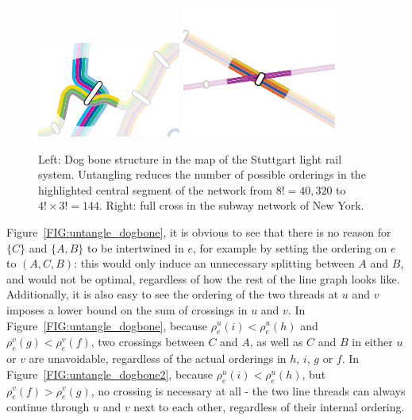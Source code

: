 \documentclass[format=acmsmall, review=false, screen=true]{acmart}
\begin{document}
\begin{figure}
  \centering
  \includegraphics[width=0.42\textwidth, page=1]{untangling/vvs_dogbone.pdf}
  \hfill
  \includegraphics[width=0.45\textwidth, page=1, trim={0.2cm 0.5cm 0.2cm 0.5cm}, clip]{untangling/ny_cross.pdf}
  \caption{Left: Dog bone structure in the map of the Stuttgart light rail system. Untangling reduces the number of possible orderings in the highlighted central segment of the network from $8! = 40,320$ to $4! \times 3! = 144$. Right: full cross in the subway network of New York.}  
  \label{FIG:untangle_dogbone_stuttgart}
\end{figure}

Figure~\ref{FIG:untangle_dogbone}, it is obvious to see that there is no reason for $\{C\}$ and $\{A, B\}$ to be intertwined in $e$, for example by setting the ordering on $e$ to $(A, C, B)$: this would only induce an unnecessary splitting between $A$ and $B$, and would not be optimal, regardless of how the rest of the line graph looks like.
Additionally, it is also easy to see the ordering of the two threads at $u$ and $v$ imposes a lower bound on the sum of crossings in $u$ and $v$.
In Figure~\ref{FIG:untangle_dogbone}, because $\rho^u_e(i) < \rho^u_e(h)$ and $\rho^v_e(g) < \rho^v_e(f)$, two crossings between $C$ and $A$, as well as $C$ and $B$ in either $u$ or $v$ are unavoidable, regardless of the actual orderings in $h$, $i$, $g$ or $f$.
In Figure~\ref{FIG:untangle_dogbone2}, because $\rho^u_e(i) < \rho^u_e(h)$, but $\rho^v_e(f) > \rho^v_e(g)$, no crossing is necessary at all - the two line threads can always continue through $u$ and $v$ next to each other, regardless of their internal ordering. 
\end{document}
